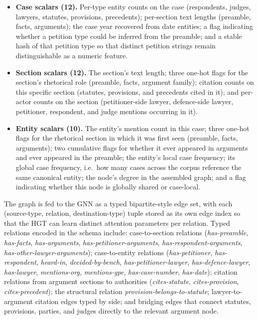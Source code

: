 \documentclass[runningheads]{llncs}
\begin{document}
\begin{itemize}[leftmargin=*]
    \item \textbf{Case scalars (12).} Per-type entity counts on the case (respondents, judges, lawyers, statutes, provisions, precedents); per-section text lengths (preamble, facts, arguments); the case year recovered from date entities; a flag indicating whether a petition type could be inferred from the preamble; and a stable hash of that petition type so that distinct petition strings remain distinguishable as a numeric feature.

    \item \textbf{Section scalars (12).} The section's text length; three one-hot flags for the section's rhetorical role (preamble, facts, argument family); citation counts on this specific section (statutes, provisions, and precedents cited in it); and per-actor counts on the section (petitioner-side lawyer, defence-side lawyer, petitioner, respondent, and judge mentions occurring in it).

    \item \textbf{Entity scalars (10).} The entity's mention count in this case; three one-hot flags for the rhetorical section in which it was first seen (preamble, facts, arguments); two cumulative flags for whether it ever appeared in arguments and ever appeared in the preamble; the entity's local case frequency; its global case frequency, i.e.\ how many cases across the corpus reference the same canonical entity; the node's degree in the assembled graph; and a flag indicating whether this node is globally shared or case-local.
\end{itemize}

The graph is fed to the GNN as a typed bipartite-style edge set, with each (source-type, relation, destination-type) tuple stored as its own edge index so that the HGT can learn distinct attention parameters per relation. Typed relations encoded in the schema include: case-to-section relations (\emph{has-preamble}, \emph{has-facts}, \emph{has-arguments}, \emph{has-petitioner-arguments}, \emph{has-respondent-arguments}, \emph{has-other-lawyer-arguments}); case-to-entity relations (\emph{has-petitioner}, \emph{has-respondent}, \emph{heard-in}, \emph{decided-by-bench}, \emph{has-petitioner-lawyer}, \emph{has-defence-lawyer}, \emph{has-lawyer}, \emph{mentions-org}, \emph{mentions-gpe}, \emph{has-case-number}, \emph{has-date}); citation relations from argument sections to authorities (\emph{cites-statute}, \emph{cites-provision}, \emph{cites-precedent}); the structural relation \emph{provision-belongs-to-statute}; lawyer-to-argument citation edges typed by side; and bridging edges that connect statutes, provisions, parties, and judges directly to the relevant argument node.
\end{document}
